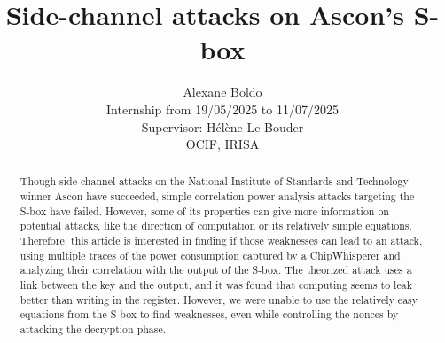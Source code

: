 \documentclass[11pt,technote]{IEEEtran}
\author{
	Alexane Boldo\\
	Internship from 19/05/2025 to 11/07/2025\\
	Supervisor: Hélène Le Bouder\\
	OCIF, IRISA
}
\title{Side-channel attacks on Ascon's S-box}
\date{}
\begin{document}
	\maketitle
	
	\begin{abstract}
		Though side-channel attacks on the National Institute of Standards and Technology winner Ascon have succeeded, simple correlation power analysis attacks targeting the S-box have failed. However, some of its properties can give more information on potential attacks, like the direction of computation or its relatively simple equations. Therefore, this article is interested in finding if those weaknesses can lead to an attack, using multiple traces of the power consumption captured by a ChipWhisperer and analyzing their correlation with the output of the S-box. The theorized attack uses a link between the key and the output, and it was found that computing seems to leak better than writing in the register. However, we were unable to use the relatively easy equations from the S-box to find weaknesses, even while controlling the nonces by attacking the decryption phase.
	\end{abstract}
	
	
\end{document}

